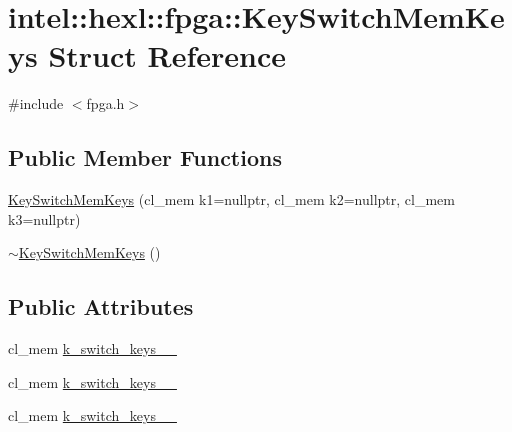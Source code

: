 \hypertarget{structintel_1_1hexl_1_1fpga_1_1KeySwitchMemKeys}{\section{intel\-:\-:hexl\-:\-:fpga\-:\-:Key\-Switch\-Mem\-Keys Struct Reference}
\label{structintel_1_1hexl_1_1fpga_1_1KeySwitchMemKeys}
}


{\ttfamily \#include $<$fpga.\-h$>$}

\subsection*{Public Member Functions}
\begin{DoxyCompactItemize}
\item 
\hyperlink{structintel_1_1hexl_1_1fpga_1_1KeySwitchMemKeys_abf02925aad155c87456f1b994d901855}{Key\-Switch\-Mem\-Keys} (cl\-\_\-mem k1=nullptr, cl\-\_\-mem k2=nullptr, cl\-\_\-mem k3=nullptr)
\item 
\hyperlink{structintel_1_1hexl_1_1fpga_1_1KeySwitchMemKeys_a748e730ef5ada07f6497de374f035bb9}{$\sim$\-Key\-Switch\-Mem\-Keys} ()
\end{DoxyCompactItemize}
\subsection*{Public Attributes}
\begin{DoxyCompactItemize}
\item 
cl\-\_\-mem \hyperlink{structintel_1_1hexl_1_1fpga_1_1KeySwitchMemKeys_a1ab398e60f61d42514a9ca481335ba23}{k\-\_\-switch\-\_\-keys\-\_\-\_\-}
\item 
cl\-\_\-mem \hyperlink{structintel_1_1hexl_1_1fpga_1_1KeySwitchMemKeys_a58852e402411f195954ee043f8dbb5b7}{k\-\_\-switch\-\_\-keys\-\_\-\_\-}
\item 
cl\-\_\-mem \hyperlink{structintel_1_1hexl_1_1fpga_1_1KeySwitchMemKeys_ab05db195636fe7912aabc7c340c5077d}{k\-\_\-switch\-\_\-keys\-\_\-\_\-}
\end{DoxyCompactItemize}


